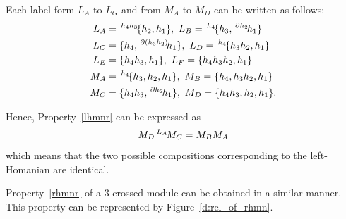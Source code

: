 \documentclass{tac}
\newcommand{\act}[1]{\,\sp{#1}\!}
\newcommand{\del}{\partial}
\begin{document}
\begin{appendices}
Each label form $L_A$ to $L_G$ and from $M_A$ to $M_D$ can be written as follows:
\begin{equation*}
    \begin{aligned}
L_A &= \act{h_4h_3}\{h_2, h_1\}, \ 
L_B = \act{h_4}\{h_3,\act{\del h_2} h_1 \} \\
L_C &= \{h_4, \act{\del(h_3h_2)}h_1 \}, \ 
L_D=\act{h_4}\{h_3h_2, h_1\} \\
L_E &=\{h_4h_3,h_1\}, \ 
L_F =\{h_4h_3h_2,h_1\}\\
M_A &= \act{h_4}\{h_3, h_2, h_1\}, \ 
M_B =\{h_4, h_3 h_2, h_1\}\\
M_C &= \{h_4h_3,\act{\del h_2}h_1\}, \ 
M_D = \{h_4h_3, h_2, h_1\}.
\end{aligned}
\end{equation*}

Hence, Property~\ref{lhmnr} can be expressed as
\[
M_D \act{L_A}M_C = M_B M_A
\]
which means that the two possible compositions corresponding to the left-Homanian are identical.

Property~\ref{rhmnr} of a 3-crossed module can be obtained in a similar manner.  This property can be represented by Figure~\ref{d:rel_of_rhmn}.


\end{appendices}
\end{document}
